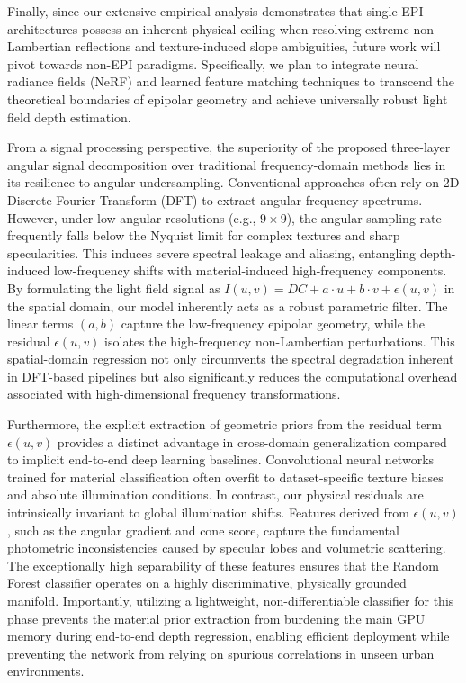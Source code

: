 \documentclass[lettersize,journal]{IEEEtran}
\begin{document}
Finally, since our extensive empirical analysis demonstrates that single EPI architectures possess an inherent physical ceiling when resolving extreme non-Lambertian reflections and texture-induced slope ambiguities, future work will pivot towards non-EPI paradigms. Specifically, we plan to integrate neural radiance fields (NeRF) and learned feature matching techniques to transcend the theoretical boundaries of epipolar geometry and achieve universally robust light field depth estimation.

From a signal processing perspective, the superiority of the proposed three-layer angular signal decomposition over traditional frequency-domain methods lies in its resilience to angular undersampling. Conventional approaches often rely on 2D Discrete Fourier Transform (DFT) to extract angular frequency spectrums. However, under low angular resolutions (e.g., $9 \times 9$), the angular sampling rate frequently falls below the Nyquist limit for complex textures and sharp specularities. This induces severe spectral leakage and aliasing, entangling depth-induced low-frequency shifts with material-induced high-frequency components. By formulating the light field signal as $I(u,v) = DC + a\cdot u + b\cdot v + \epsilon(u,v)$ in the spatial domain, our model inherently acts as a robust parametric filter. The linear terms $(a, b)$ capture the low-frequency epipolar geometry, while the residual $\epsilon(u,v)$ isolates the high-frequency non-Lambertian perturbations. This spatial-domain regression not only circumvents the spectral degradation inherent in DFT-based pipelines but also significantly reduces the computational overhead associated with high-dimensional frequency transformations.

Furthermore, the explicit extraction of geometric priors from the residual term $\epsilon(u,v)$ provides a distinct advantage in cross-domain generalization compared to implicit end-to-end deep learning baselines. Convolutional neural networks trained for material classification often overfit to dataset-specific texture biases and absolute illumination conditions. In contrast, our physical residuals are intrinsically invariant to global illumination shifts. Features derived from $\epsilon(u,v)$, such as the angular gradient and cone score, capture the fundamental photometric inconsistencies caused by specular lobes and volumetric scattering. The exceptionally high separability of these features ensures that the Random Forest classifier operates on a highly discriminative, physically grounded manifold. Importantly, utilizing a lightweight, non-differentiable classifier for this phase prevents the material prior extraction from burdening the main GPU memory during end-to-end depth regression, enabling efficient deployment while preventing the network from relying on spurious correlations in unseen urban environments.
\end{document}
